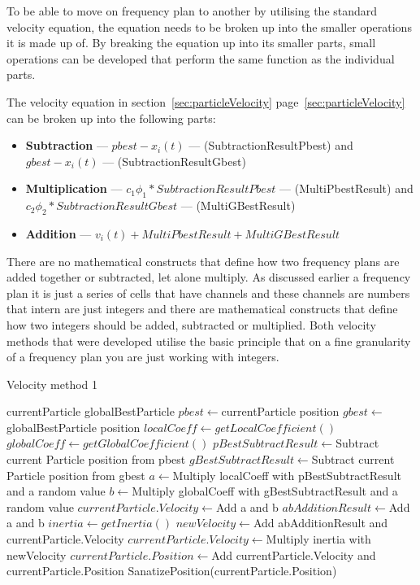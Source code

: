 To be able to move on frequency plan to another by utilising the standard velocity equation, the equation needs to be broken up into the smaller operations it is made up of. By breaking the equation up into its smaller parts, small operations can be developed that perform the same function as the individual parts. 

The velocity equation in section~\ref{sec:particleVelocity} page~\ref{sec:particleVelocity} can be broken up into the following parts:
\label{lst:velocitybreakup}
\begin{itemize}
\item \textbf{Subtraction} --- $pbest - x_i(t)$ --- (SubtractionResultPbest) and $gbest - x_i(t)$ --- (SubtractionResultGbest)
\item \textbf{Multiplication} --- $c_1\phi_1 * SubtractionResultPbest$ --- (MultiPbestResult) and $c_2\phi_2 * SubtractionResultGbest$ --- (MultiGBestResult)
\item \textbf{Addition} --- $v_i(t) + MultiPbestResult + MultiGBestResult$
\end{itemize}
There are no mathematical constructs that define how two frequency plans are added together or subtracted, let alone multiply. As discussed earlier a frequency plan it is just a series of cells that have channels and these channels are numbers that intern are just integers and there are mathematical constructs that define how two integers should be added, subtracted or multiplied. Both velocity methods that were developed utilise the basic principle that on a fine granularity of a frequency plan you are just working with integers.

\begin{algorithm}
\caption{Velocity method 1}
\label{alg:velocitymethod1}
	\begin{algorithmic}[1]
	\REQUIRE currentParticle
	\REQUIRE globalBestParticle
	\STATE $pbest \leftarrow $currentParticle position
	\STATE $gbest \leftarrow $globalBestParticle position
	\STATE $localCoeff \leftarrow getLocalCoefficient()$
	\STATE $globalCoeff \leftarrow getGlobalCoefficient()$
	\STATE $pBestSubtractResult \leftarrow $Subtract current Particle position from pbest
	\STATE $gBestSubtractResult \leftarrow $Subtract current Particle position from gbest
	\STATE $a \leftarrow $Multiply localCoeff with pBestSubtractResult and a random value
	\STATE $b \leftarrow $Multiply globalCoeff with gBestSubtractResult and a random value
		\STATE $currentParticle.Velocity \leftarrow $Add a and b
	\ELSE
		\STATE $abAdditionResult \leftarrow $Add a and b
		\STATE $inertia \leftarrow getInertia()$
		\STATE $newVelocity \leftarrow $Add abAdditionResult and currentParticle.Velocity
		\STATE $currentParticle.Velocity \leftarrow $Multiply inertia with newVelocity
	\ENDIF
	\STATE $currentParticle.Position \leftarrow $Add currentParticle.Velocity and currentParticle.Position
	\STATE SanatizePosition(currentParticle.Position)
	\end{algorithmic}
\end{algorithm}

